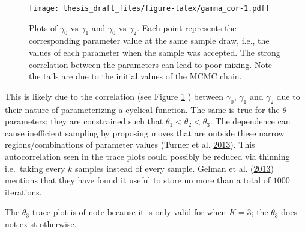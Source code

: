 \documentclass[11pt,a4paper]{article}
\begin{document}
\begin{figure}
\centering
\texttt{[image: thesis\_draft\_files/figure-latex/gamma\_cor-1.pdf]}
\caption{\label{fig:cor_gammas} Plots of \(\gamma_0\) vs \(\gamma_1\)
and \(\gamma_0\) vs \(\gamma_2\). Each point represents the
corresponding parameter value at the same sample draw, i.e., the values
of each parameter when the sample was accepted. The strong correlation
between the parameters can lead to poor mixing. Note the tails are due
to the initial values of the MCMC chain.}
\end{figure}

This is likely due to the correlation (see Figure \ref{fig:cor_gammas} )
between \(\gamma_0\), \(\gamma_1\) and \(\gamma_2\) due to their nature
of parameterizing a cyclical function. The same is true for the
\(\theta\) parameters; they are constrained such that
\(\theta_1 < \theta_2 < \theta_3\). The dependence can cause inefficient
sampling by proposing moves that are outside these narrow
regions/combinations of parameter values (Turner et al.
\protect\hyperlink{ref-turner_method_2013}{2013}). This autocorrelation
seen in the trace plots could possibly be reduced via thinning
i.e.~taking every \(k\) samples instead of every sample. Gelman et al.
(\protect\hyperlink{ref-gelman_bayesian_2013}{2013}) mentions that they
have found it useful to store no more than a total of \(1000\)
iterations.

The \(\theta_3\) trace plot is of note because it is only valid for when
\(K = 3\); the \(\theta_3\) does not exist otherwise.
\end{document}
